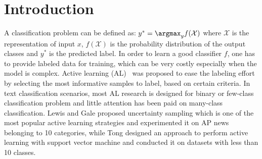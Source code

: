 
\section{Introduction}
\label{sec:intro}

%
A classification problem can be defined as: $y^* = \argmax_y f(\mathcal{X})$ 
where $\mathcal{X}$ is 
the representation of input $x$, 
$f(\mathcal{X})$ is the probability distribution of the output classes
and $y^*$ is the predicted label. In order to learn a good classifier $f$,
one has to provide labeled data for training, which can be very costly
especially when the model is complex.  
Active learning (AL)~\cite{settles2009active} was proposed to ease the 
labeling effort by selecting the most informative samples to label, 
based on certain criteria. In text classification scenarios, most AL research is designed for 
binary or few-class classification problem 
and little attention has been paid on many-class classification. Lewis and Gale  proposed uncertainty sampling which is one of the most popular active learning strategies and experimented it on AP news belonging to 10 categories, while Tong  designed an approach to perform active learning with support vector machine and conducted it on datasets 
with less than 10 classes. 

